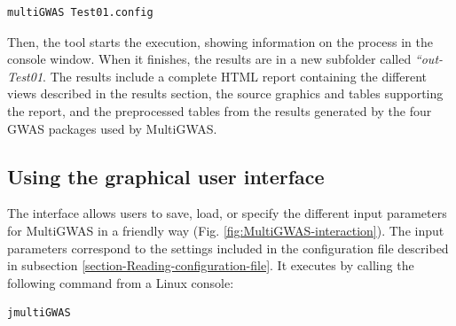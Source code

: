 \documentclass{article}
\begin{document}
\begin{lstlisting}[language=bash,basicstyle={\small}]
multiGWAS Test01.config
\end{lstlisting}

Then, the tool starts the execution, showing information on the process in the console window. When it finishes, the results are in a new subfolder called \emph{``out-Test01}.  The results include a complete HTML report containing the different views described in the results section, the source graphics and tables supporting the report, and the preprocessed tables from the results generated by the four GWAS packages used by MultiGWAS.


\subsection{Using the graphical user interface}
The interface allows users to save, load, or specify the different input parameters for MultiGWAS in a friendly way (Fig. \ref{fig:MultiGWAS-interaction}). The input parameters correspond to the settings included in the configuration file described in subsection \ref{section-Reading-configuration-file}. It executes by calling the following command from a Linux console:

\begin{lstlisting}[language=bash,basicstyle={\small}]
jmultiGWAS
\end{lstlisting}
\end{document}
